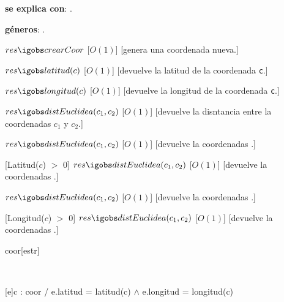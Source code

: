 \begin{Interfaz}


  \textbf{se explica con}: .

  \textbf{g\'eneros}: .



  {$res \igobs crearCoor$}%
  [$O(1)$]
  [genera una coordenada nueva.]


  {$res \igobs latitud(c)$}
  [$O(1)$]
  [devuelve la latitud de la coordenada \texttt{c}.]

  {$res \igobs longitud(c)$}
  [$O(1)$]
  [devuelve la longitud de la coordenada \texttt{c}.]


  {$res \igobs distEuclidea(c_1, c_2)$}%
  [$O(1)$]
  [devuelve la disntancia entre la coordenadas \texttt{$c_1$} y \texttt{$c_2$}.]

  {$res \igobs distEuclidea(c_1, c_2)$}
  [$O(1)$]
  [devuelve la coordenadas .]

  [Latitud($c$) $>$ 0]
  {$res \igobs distEuclidea(c_1, c_2)$}
  [$O(1)$]
  [devuelve la coordenadas .]

  {$res \igobs distEuclidea(c_1, c_2)$}
  [$O(1)$]
  [devuelve la coordenadas .]

  [Longitud($c$) $>$ 0]
  {$res \igobs distEuclidea(c_1, c_2)$}
  [$O(1)$]
  [devuelve la coordenadas .]


\end{Interfaz}

\begin{Representacion}
 
  \begin{Estructura}{coor}[estr]
      \begin{Tupla}[estr]%
    \end{Tupla}
  \end{Estructura}


  ~

  [e]{c : coor / e.latitud = latitud(c) $\land$ e.longitud = longitud(c)}

\end{Representacion}

